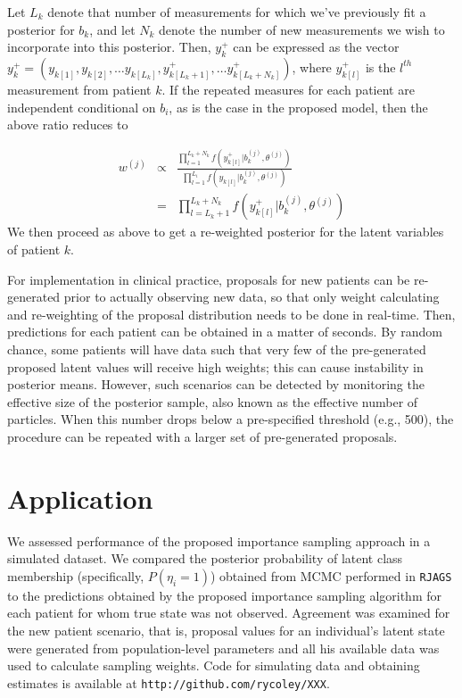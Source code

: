 \documentclass[12pt, letterpaper]{article}
\begin{document}
Let $L_{k}$ denote that number of measurements for which we've previously fit a posterior for $b_{k}$, and let $N_{k}$ denote the number of new measurements we wish to incorporate into this posterior. Then, $y_{k}^{+}$ can be expressed as the vector $y_{k}^{+}=(y_{k[1]},y_{k[2]},\dots y_{k[L_{k}]},y_{k[L_{k}+1]}^{+},\dots y_{k[L_{k}+N_{k}]}^{+})$, where $y_{k[l]}^{+}$ is the $l^{th}$ measurement from patient $k$. If the repeated measures for each patient are independent conditional on $b_{i}$, as is the case in the proposed model, then the above ratio reduces to

\begin{eqnarray*}
w^{(j)} & \propto & \frac{\prod_{l=1}^{L_{k}+N_{k}}f(\ensuremath{ y_{k[l]}^{+}} |b_{k}^{(j)},\theta^{(j)})}{\prod_{l=1}^{L_{i}}f(\ensuremath{y_{k[l]}} |b_{ k}^{(j)},\theta^{(j)})}\\
 & = & \prod_{l=L_{k}+1}^{L_{k}+N_{k}}f(\ensuremath{y_{k[l]}^{+}}|b_{k}^{(j)},\theta^{(j)})
\end{eqnarray*}
We then proceed as above to get a re-weighted posterior for the latent variables of patient $k$. 

For implementation in clinical practice, proposals for new patients can be re-generated prior to actually observing new data, so that only weight calculating and re-weighting of the proposal distribution needs to be done in real-time. Then, predictions for each patient can be obtained in a matter of seconds. By random chance, some patients will have data such that very few of the pre-generated proposed latent values will receive high weights; this can cause instability in posterior means. However, such scenarios can be detected by monitoring the effective size of the posterior sample, also known as the effective number of particles. When this number drops below a pre-specified threshold (e.g., 500), the procedure can be repeated with a larger set of pre-generated proposals. 



\section{Application}
We assessed performance of the proposed importance sampling approach in a simulated dataset. We compared the posterior probability of latent class membership (specifically, $P(\eta_i=1)$) obtained from MCMC performed in \texttt{RJAGS} to the predictions obtained by the proposed importance sampling algorithm for each patient for whom true state was not observed. Agreement was examined for the new patient scenario, that is, proposal values for an individual's latent state were generated from population-level parameters and all his available data was used to calculate sampling weights. Code for simulating data and obtaining estimates is available at \texttt{http://github.com/rycoley/XXX}.
\end{document}

